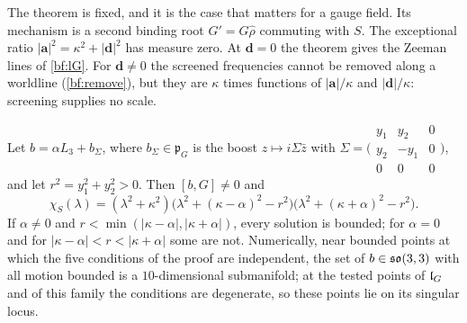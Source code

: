 The theorem is fixed, and it is the case that matters for a gauge field. Its mechanism is a second binding root $G'=G\hat\rho$ commuting with $S$. The exceptional ratio $|\mathbf a|^2=\kappa^2+|\mathbf d|^2$ has
measure zero. At $\mathbf d=0$ the theorem gives the Zeeman lines of \cref{bf:lG}. For $\mathbf d\neq0$ the screened frequencies cannot be removed
along a worldline (\cref{bf:remove}), but they are $\kappa$ times functions of $|\mathbf a|/\kappa$ and $|\mathbf d|/\kappa$: screening supplies no
scale.

\begin{proposition}
\label{bf:gyro}
Let $b=\alpha L_3+b_\Sigma$, where $b_\Sigma\in\mathfrak p_G$ is the boost $z\mapsto i\Sigma\bar z$ with
$\Sigma=\bigl(\begin{smallmatrix}y_1&y_2&0\\y_2&-y_1&0\\0&0&0\end{smallmatrix}\bigr)$, and let $r^2=y_1^2+y_2^2>0$. Then $[b,G]\neq0$ and
\[
\chi_S(\lambda)=(\lambda^2+\kappa^2)\bigl(\lambda^2+(\kappa-\alpha)^2-r^2\bigr)\bigl(\lambda^2+(\kappa+\alpha)^2-r^2\bigr).
\]
If $\alpha\neq0$ and $r<\min(|\kappa-\alpha|,|\kappa+\alpha|)$, every solution is bounded; for $\alpha=0$ and for $|\kappa-\alpha|<r<|\kappa+\alpha|$ some
are not. Numerically, near bounded points at which the five conditions of the proof are independent, the set of $b\in\mathfrak{so}(3,3)$ with all motion
bounded is a $10$-dimensional submanifold; at the tested points of $\mathfrak l_G$ and of this family the conditions are degenerate, so these points lie on
its singular locus.
\end{proposition}


